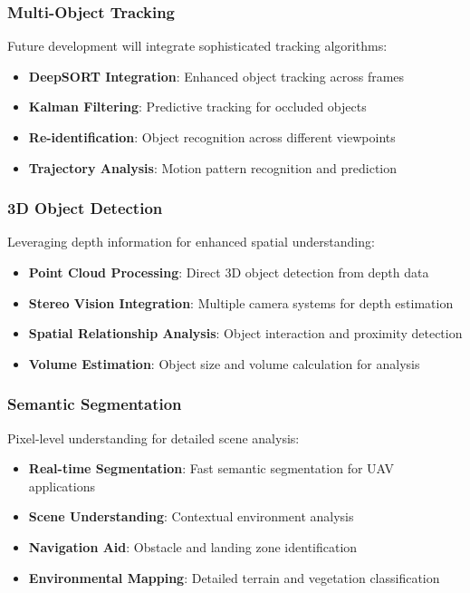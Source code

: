 \documentclass[12pt,a4paper]{article}
\begin{document}
\subsubsection{Multi-Object Tracking}

Future development will integrate sophisticated tracking algorithms:

\begin{itemize}
    \item \textbf{DeepSORT Integration}: Enhanced object tracking across frames
    \item \textbf{Kalman Filtering}: Predictive tracking for occluded objects
    \item \textbf{Re-identification}: Object recognition across different viewpoints
    \item \textbf{Trajectory Analysis}: Motion pattern recognition and prediction
\end{itemize}

\subsubsection{3D Object Detection}

Leveraging depth information for enhanced spatial understanding:

\begin{itemize}
    \item \textbf{Point Cloud Processing}: Direct 3D object detection from depth data
    \item \textbf{Stereo Vision Integration}: Multiple camera systems for depth estimation
    \item \textbf{Spatial Relationship Analysis}: Object interaction and proximity detection
    \item \textbf{Volume Estimation}: Object size and volume calculation for analysis
\end{itemize}

\subsubsection{Semantic Segmentation}

Pixel-level understanding for detailed scene analysis:

\begin{itemize}
    \item \textbf{Real-time Segmentation}: Fast semantic segmentation for UAV applications
    \item \textbf{Scene Understanding}: Contextual environment analysis
    \item \textbf{Navigation Aid}: Obstacle and landing zone identification
    \item \textbf{Environmental Mapping}: Detailed terrain and vegetation classification
\end{itemize}
\end{document}

